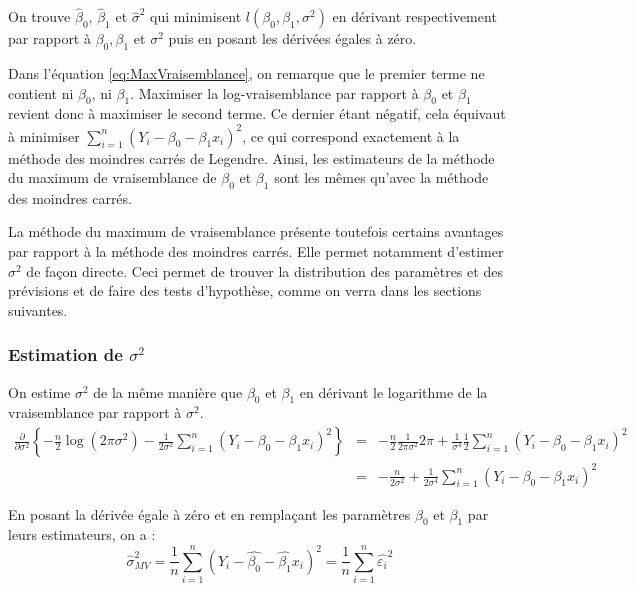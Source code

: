 On trouve $\hat\beta_0$, $\hat\beta_1$ et $\hat\sigma^2$ qui minimisent $l (\beta_0, \beta_1,\sigma^2)$ en dérivant respectivement par rapport à $\beta_0,\beta_1$ et $\sigma^2$ puis en posant les dérivées égales à zéro.

Dans l'équation \eqref{eq:MaxVraisemblance}, on remarque que le premier terme ne contient ni $\beta_0$, ni $\beta_1$. Maximiser la log-vraisemblance par rapport à $\beta_0$ et $\beta_1$ revient donc à maximiser le second terme. Ce dernier étant négatif, cela équivaut à minimiser $\sum_{i=1}^n (Y_i - \beta_0 - \beta_1 x_i)^2$, ce qui correspond exactement à la méthode des moindres carrés de Legendre.  Ainsi, les estimateurs de la méthode du maximum de vraisemblance de $\beta_0$ et $\beta_1$ sont les mêmes qu'avec la méthode des moindres carrés.

La méthode du maximum de vraisemblance présente toutefois certains avantages par rapport à la méthode des moindres carrés. Elle permet notamment d'estimer $\sigma^2$ de façon directe. Ceci permet de trouver la distribution des paramètres et des prévisions et de faire des tests d'hypothèse, comme on verra dans les sections suivantes.

\subsubsection{Estimation de $\sigma^2$}
On estime $\sigma^2$ de la même manière que $\beta_0$ et $\beta_1$ en dérivant le logarithme de la vraisemblance par rapport à $\sigma^2$.
 \begin{eqnarray*}
 \frac{\partial}{\partial \sigma^2}\left\{ -\frac{n}{2} \log (2\pi\sigma^2)-\frac{1}{2 \sigma^2}\sum_{i=1}^n (Y_i - \beta_0 - \beta_1 x_i)^2\right\}
 & = & -\frac{n}{2} \frac{1}{2\pi\sigma^2} 2\pi + \frac{1}{\sigma^4} \frac{1}{2}\sum_{i=1}^n(Y_i-\beta_0-\beta_1 x_i)^2 \\
 & = & -\frac{n}{2\sigma^2}+ \frac{1}{2 \sigma^4}\sum_{i=1}^n(Y_i-\beta_0-\beta_1 x_i)^2
\end{eqnarray*}

En posant la dérivée égale à zéro et en remplaçant les paramètres $\beta_0$ et $\beta_1$ par leurs estimateurs, on a :
\begin{equation}
 \hat{\sigma}^2_{MV} = \frac{1}{n}\sum_{i=1}^n(Y_i - \hat{\beta_0} - \hat{\beta_1}x_i)^2 = \frac{1}{n}\sum_{i=1}^n \hat{\varepsilon_i}^2
 \label{sigma2}
\end{equation}

